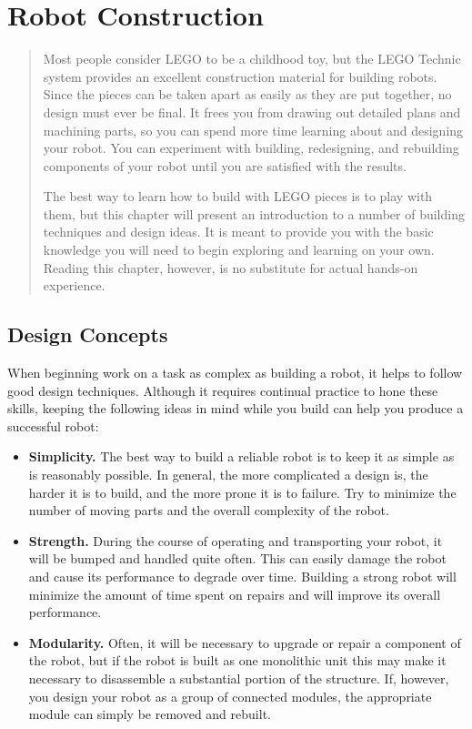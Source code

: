 \chapter{Robot Construction}
\begin{quote}
Most people consider LEGO to be a childhood toy, but the LEGO Technic
system provides an excellent construction material for building
robots. Since the pieces can be taken apart as easily as they are put
together, no design must ever be final.  It frees you from drawing out
detailed plans and machining parts, so you can spend more time
learning about and designing your robot.  You can experiment with
building, redesigning, and rebuilding components of your robot until
you are satisfied with the results.

The best way to learn how to build with LEGO pieces is to play with
them, but this chapter will present an introduction to a number of
building techniques and design ideas.  It is meant to provide you with
the basic knowledge you will need to begin exploring and learning on
your own.  Reading this chapter, however, is no substitute for actual
hands-on experience.
\end{quote}

\section{Design Concepts}

When beginning work on a task as complex as building a robot, it helps
to follow good design techniques.  Although it requires continual
practice to hone these skills, keeping the following ideas in mind
while you build can help you produce a successful robot:

\begin{itemize}

 \item{\bf Simplicity.} The best way to build a reliable robot is to
 keep it as simple as is reasonably possible.  In general, the more
 complicated a design is, the harder it is to build, and the more
 prone it is to failure.  Try to minimize the number of moving parts
 and the overall complexity of the robot.

 \item{\bf Strength.} During the course of operating and transporting
 your robot, it will be bumped and handled quite often.  This can
 easily damage the robot and cause its performance to degrade over
 time.  Building a strong robot will minimize the amount of time spent
 on repairs and will improve its overall performance.

 \item{\bf Modularity.} Often, it will be necessary to upgrade or
 repair a component of the robot, but if the robot is built as one
 monolithic unit this may make it necessary to disassemble a
 substantial portion of the structure.  If, however, you design your
 robot as a group of connected modules, the appropriate module can
 simply be removed and rebuilt.

\end{itemize}

